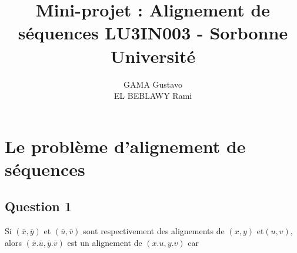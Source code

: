 \documentclass{report}
\title{Mini-projet : Alignement de séquences LU3IN003 - Sorbonne Université}
\author{GAMA Gustavo \\ EL BEBLAWY Rami}
\date{}
\begin{document}
\maketitle

\section*{Le problème d'alignement de séquences}
\subsection*{Question 1}
Si \begin{math}
            (\bar{x},\bar{y})  
            \end{math} 
et \begin{math}
            (\bar{u},\bar{v}) 
            \end{math} 
sont respectivement des alignements de \begin{math}
            (x,y)\end{math} 
et\begin{math}
                    (u,v)
                    \end{math}, 
alors \begin{math}
                   (\bar{x}.\bar{u},\bar{y}.\bar{v})
                  \end{math}
est un alignement de \begin{math}
                      (x.u, y.v)
                     \end{math}
car
\end{document}
